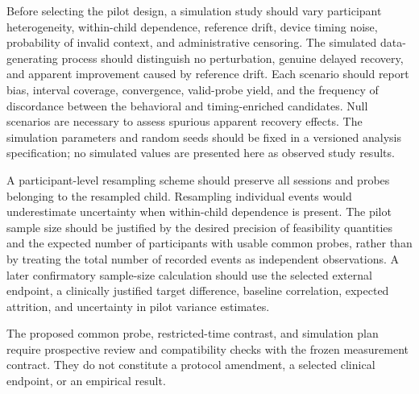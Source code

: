 Before selecting the pilot design, a simulation study should vary participant heterogeneity, within-child dependence, reference drift, device timing noise, probability of invalid context, and administrative censoring. The simulated data-generating process should distinguish no perturbation, genuine delayed recovery, and apparent improvement caused by reference drift. Each scenario should report bias, interval coverage, convergence, valid-probe yield, and the frequency of discordance between the behavioral and timing-enriched candidates. Null scenarios are necessary to assess spurious apparent recovery effects. The simulation parameters and random seeds should be fixed in a versioned analysis specification; no simulated values are presented here as observed study results.

A participant-level resampling scheme should preserve all sessions and probes belonging to the resampled child. Resampling individual events would underestimate uncertainty when within-child dependence is present. The pilot sample size should be justified by the desired precision of feasibility quantities and the expected number of participants with usable common probes, rather than by treating the total number of recorded events as independent observations. A later confirmatory sample-size calculation should use the selected external endpoint, a clinically justified target difference, baseline correlation, expected attrition, and uncertainty in pilot variance estimates.

The proposed common probe, restricted-time contrast, and simulation plan require prospective review and compatibility checks with the frozen measurement contract. They do not constitute a protocol amendment, a selected clinical endpoint, or an empirical result.
